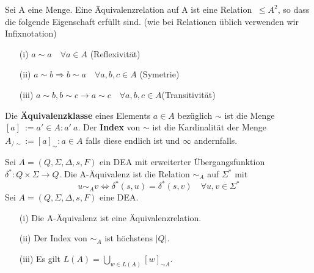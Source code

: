  Sei A eine Menge. Eine Äquivalenzrelation auf A ist eine Relation $~ \leq A^{2}$, so dass die folgende Eigenschaft erfüllt sind. (wie bei Relationen üblich verwenden wir Infixnotation)
\begin{itemize}
    \item [(i)] $a \sim a \quad \forall a \in A $ (Reflexivität)
    \item [(ii)] $a \sim b \Rightarrow  b \sim a \quad \forall a, b, c \in A$ (Symetrie)
    \item [(iii)] $a \sim b, b \sim c \rightarrow a \sim c \quad \forall a, b, c \in A$(Transitivität)
\end{itemize}
Die \textbf{Äquivalenzklasse} eines Elements $a \in A$ bezüglich $\sim$ ist die Menge $[a]_{~} := {a' \in A : a' ~a}$. Der \textbf{Index} von $\sim$ ist die Kardinalität der Menge $A_{/\sim} := {[a]_{\sim} : a \in A}$ falls diese endlich ist und $\infty$  andernfalls.

 Sei $A = (Q, \Sigma, \Delta, s, F)$ ein DEA mit erweiterter Übergangsfunktion 
$\delta^{*}: Q \times \Sigma \rightarrow Q$. Die A-Äquivalenz ist die Relation $\sim_A$ auf $\Sigma^{*}$ mit \[u \sim_A v \Leftrightarrow \delta^*(s, u) = \delta^*(s,v) \quad \forall u, v \in \Sigma^*\]
 Sei $A = (Q, \Sigma, \Delta, s, F)$ eine DEA.
\begin{itemize}
    \item [(i)] Die A-Äquivalenz ist eine Äquivalenzrelation.
    \item [(ii)] Der Index von $\sim_{A}$ ist höchstens $|Q|$.
    \item [(iii)] Es gilt $L(A) = \bigcup \limits_{w \in L(A)} [w]_{\sim A}$.
\end{itemize}

